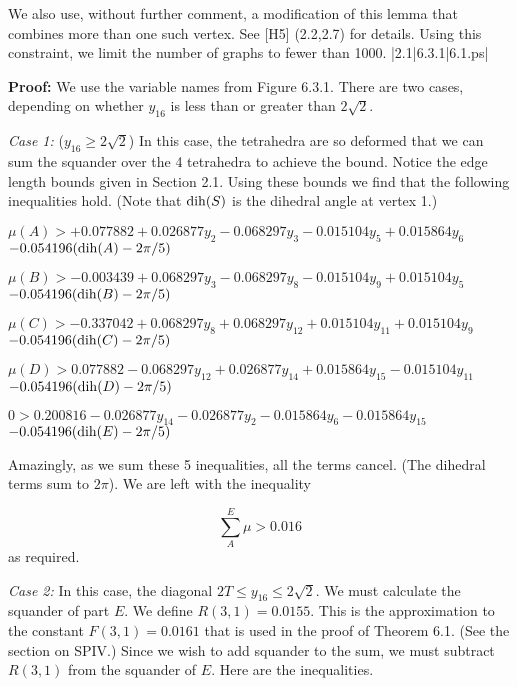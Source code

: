 We also use, without further comment, a modification of this lemma that 
combines more than one such vertex.  See [H5] (2.2,2.7) for details.
Using this constraint, we limit the number of graphs to fewer than 1000.  
\smallskip
\gram|2.1|6.3.1|6.1.ps|  %


{\bf Proof:} We use the variable names from Figure 6.3.1. 
There are two cases, depending on whether $y_{16}$ is less than or greater than $2\sqrt 2$.

{\it Case 1:} ($y_{16}\ge2\sqrt2$) In this case, the tetrahedra are so deformed that we can sum the squander over the 4 tetrahedra to achieve the bound.  
Notice the edge length bounds given in Section 2.1.  Using these bounds we find that the following inequalities hold.  (Note that $\operatorname{dih}(S)$ is the dihedral angle at vertex 1.)



$\mu(A) > + 0.077882  + 0.026877 y_2 - 0.068297 y_3 - 0.015104 y_5 + 0.015864 y_6$  \newline $- 0.054196 (\operatorname{dih}(A)-2 \pi /5) $

$\mu(B) > - 0.003439  + 0.068297 y_3 - 0.068297 y_8 - 0.015104 y_9 + 0.015104 y_5$  \newline $- 0.054196 (\operatorname{dih}(B)-2 \pi /5) $

$\mu(C) > - 0.337042   + 0.068297 y_8 + 0.068297 y_{12} + 0.015104 y_{11} + 0.015104 y_9$  \newline $- 0.054196 (\operatorname{dih}(C)-2 \pi /5) $

$\mu(D) > 0.077882 - 0.068297 y_{12} + 0.026877 y_{14} + 0.015864 y_{15} - 0.015104 y_{11}$ \newline $ - 0.054196 (\operatorname{dih}(D)-2 \pi /5)$

$0 > 0.200816 - 0.026877 y_{14} - 0.026877 y_2 - 0.015864 y_6 - 0.015864 y_{15} $ \newline $ - 0.054196 (\operatorname{dih}(E)-2 \pi /5)$

Amazingly, as we sum these 5 inequalities, all the terms cancel.  (The dihedral terms sum to $2\pi$). We are left with the inequality 

$$\sum_{A}^E\mu > 0.016$$
 as required. 

{\it Case 2:} In this case, the diagonal $2T\le y_{16}\le 2\sqrt 2$.  We must calculate the squander of part $E$.  
We define $R(3,1)=0.0155$.  This is the approximation to the
constant $F(3,1)=0.0161$ that is used in the proof of Theorem 6.1.
(See the section on SPIV.)
Since we wish to add squander to the sum, we must subtract $R(3,1)$ from the squander of $E$.  Here are the inequalities.


